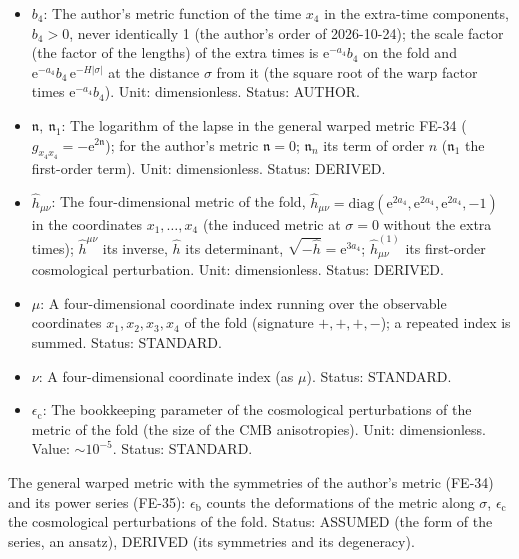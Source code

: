 \documentclass[
  10pt,
]{article}
\begin{document}
\begin{itemize}
  author's metric
  \(\mathfrak{b} = \ln b_4 - a_4 - H\lvert\sigma\rvert\);
  \(\mathfrak{b}_n\) its term of order \(n\) (\(\mathfrak{b}_1\) the
  first-order term). Unit: dimensionless. Status: DERIVED.
\item
  \(b_4\): The author's metric function of the time \(x_4\) in the
  extra-time components, \(b_4 > 0\), never identically 1 (the author's
  order of 2026-10-24); the scale factor (the factor of the lengths) of
  the extra times is \(\mathrm{e}^{-a_4}b_4\) on the fold and
  \(\mathrm{e}^{-a_4}b_4\,\mathrm{e}^{-H\lvert\sigma\rvert}\) at the
  distance \(\sigma\) from it (the square root of the warp factor times
  \(\mathrm{e}^{-a_4}b_4\)). Unit: dimensionless. Status: AUTHOR.
\item
  \(\mathfrak{n},\ \mathfrak{n}_1\): The logarithm of the lapse in the
  general warped metric FE-34
  (\(g_{x_4x_4} = -\mathrm{e}^{2\mathfrak{n}}\)); for the author's
  metric \(\mathfrak{n} = 0\); \(\mathfrak{n}_n\) its term of order
  \(n\) (\(\mathfrak{n}_1\) the first-order term). Unit: dimensionless.
  Status: DERIVED.
\item
  \(\hat h_{\mu\nu}\): The four-dimensional metric of the fold,
  \(\hat h_{\mu\nu} = \mathrm{diag}(\mathrm{e}^{2a_4}, \mathrm{e}^{2a_4}, \mathrm{e}^{2a_4}, -1)\)
  in the coordinates \(x_1, \dots, x_4\) (the induced metric at
  \(\sigma = 0\) without the extra times); \(\hat h^{\mu\nu}\) its
  inverse, \(\hat h\) its determinant,
  \(\sqrt{-\hat h} = \mathrm{e}^{3a_4}\); \(\hat h^{(1)}_{\mu\nu}\) its
  first-order cosmological perturbation. Unit: dimensionless. Status:
  DERIVED.
\item
  \(\mu\): A four-dimensional coordinate index running over the
  observable coordinates \(x_1, x_2, x_3, x_4\) of the fold (signature
  \(+,+,+,-\)); a repeated index is summed. Status: STANDARD.
\item
  \(\nu\): A four-dimensional coordinate index (as \(\mu\)). Status:
  STANDARD.
\item
  \(\epsilon_{\mathrm{c}}\): The bookkeeping parameter of the
  cosmological perturbations of the metric of the fold (the size of the
  CMB anisotropies). Unit: dimensionless. Value: \(\sim 10^{-5}\).
  Status: STANDARD.
\end{itemize}

The general warped metric with the symmetries of the author's metric
(FE-34) and its power series (FE-35): \(\epsilon_{\mathrm{b}}\) counts
the deformations of the metric along \(\sigma\),
\(\epsilon_{\mathrm{c}}\) the cosmological perturbations of the fold.
Status: ASSUMED (the form of the series, an ansatz), DERIVED (its
symmetries and its degeneracy).
\end{document}
